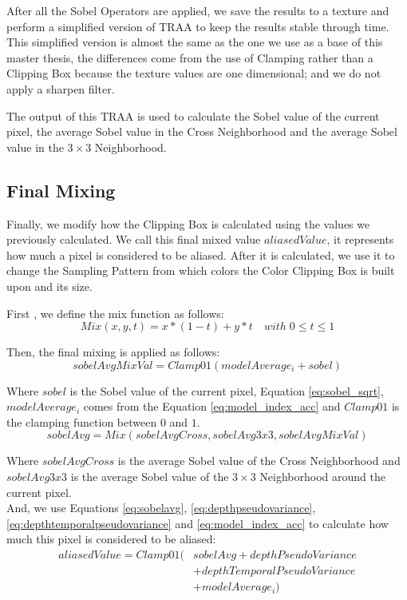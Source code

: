 \documentclass[pregrado]{tesis-usb} %
\begin{document}
After all the Sobel Operators are applied, we save the results to a texture and perform a simplified version of TRAA to keep the results stable through time. This simplified version is almost the same as the one we use as a base of this master thesis, the differences come from the use of Clamping rather than a Clipping Box because the texture values are one dimensional; and we do not apply a sharpen filter.

The output of this TRAA is used to calculate the Sobel value of the current pixel, the average Sobel value in the Cross Neighborhood and the average Sobel value in the $3\times 3$ Neighborhood.

\subsection{Final Mixing}
Finally, we  modify how the Clipping Box is calculated using the values we previously calculated. We call this final mixed value $aliasedValue$, it represents how much a pixel is considered to be aliased. After it is calculated, we use it to change the Sampling Pattern from which colors the Color Clipping Box is built upon and its  size.

First , we define the mix function as follows:
\begin{equation} \label{eq:mixfunction}
Mix(x,y,t)=x*(1-t)+y*t\quad with\; 0\leq t\leq 1
\end{equation} 

Then, the final mixing is applied as follows:
\begin{equation}\label{eq:sobelavgmixval}
sobelAvgMixVal=Clamp01(modelAverage_i+sobel) 
\end{equation}
 
Where $sobel$ is the Sobel value of the current pixel, Equation \ref{eq:sobel_sqrt}, $modelAverage_i$ comes from the Equation \ref{eq:model_index_acc} and $Clamp01$ is the clamping function between $0$ and $1$. \\

\begin{equation}\label{eq:sobelavg}
sobelAvg=Mix(sobelAvgCross, sobelAvg3x3, sobelAvgMixVal)
\end{equation}

Where $sobelAvgCross$ is the average Sobel value of the Cross Neighborhood and $sobelAvg3x3$ is the average Sobel value of the $3\times 3$ Neighborhood around the current pixel. \\ 

And, we use Equations \ref{eq:sobelavg}, \ref{eq:depthpseudovariance}, \ref{eq:depthtemporalpseudovariance} and \ref{eq:model_index_acc} to calculate how much this pixel is considered to be aliased:
\begin{equation}\label{eq:aliasedvalue}
\begin{split}
aliasedValue=Clamp01 (& sobelAvg + depthPseudoVariance \\
 & + depthTemporalPseudoVariance \\
 & + modelAverage_i)
\end{split}
\end{equation}
\end{document}

